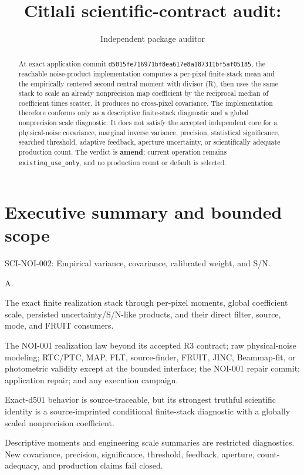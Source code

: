\documentclass[11pt]{article}
\title{\AuditPackageName\\
\large Citlali scientific-contract audit: \AuditPackageID}
\author{Independent package auditor}
\date{\AuditDate}
\newcommand{\code}[1]{\nolinkurl{#1}}
\newcommand{\AuditPackageID}{SCI-NOI-002}
\newcommand{\AuditPackageName}{Empirical variance, covariance, calibrated weight, and S/N}
\newcommand{\AuditTier}{A}
\newcommand{\AuditGoverningSHA}{d5015fe716971bf8ea617e8a187311bf5af05185}
\begin{document}
\maketitle

\begin{abstract}
At exact application commit \code{\AuditGoverningSHA}, the reachable
noise-product implementation computes a per-pixel finite-stack mean and the
empirically centered second central moment with divisor (R), then uses the
same stack to scale an already nonprecision map coefficient by the reciprocal
median of coefficient times scatter.  It produces no cross-pixel covariance.
The implementation therefore conforms only as a descriptive finite-stack
diagnostic and a global nonprecision scale diagnostic.  It does not satisfy
the accepted independent core for a physical-noise covariance, marginal
inverse variance, precision, statistical significance, searched threshold,
adaptive feedback, aperture uncertainty, or scientifically adequate
production count.  The verdict is \textbf{amend}; current operation remains
\code{existing_use_only}, and no production count or default is selected.
\end{abstract}

\section{Executive summary and bounded scope}

\begin{description}[style=nextline]
\item[Package] \AuditPackageID: \AuditPackageName.
\item[Tier] \AuditTier.
\item[Included transformation] The exact finite realization stack through
per-pixel moments, global coefficient scale, persisted uncertainty/S/N-like
products, and their direct filter, source, mode, and FRUIT consumers.
\item[Explicit exclusions] The NOI-001 realization law beyond its accepted R3
contract; raw physical-noise modeling; RTC/PTC, MAP, FLT, source-finder, FRUIT,
JINC, Beammap-fit, or photometric validity except at the bounded interface;
the NOI-001 repair commit; application repair; and any execution campaign.
\item[Claimed result] Exact-d501 behavior is source-traceable, but its strongest
truthful scientific identity is a source-imprinted conditional finite-stack
diagnostic with a globally scaled nonprecision coefficient.
\item[Consumer policy] Descriptive moments and engineering scale summaries are
restricted diagnostics.  New covariance, precision, significance, threshold,
feedback, aperture, count-adequacy, and production claims fail closed.
\end{description}
\end{document}
